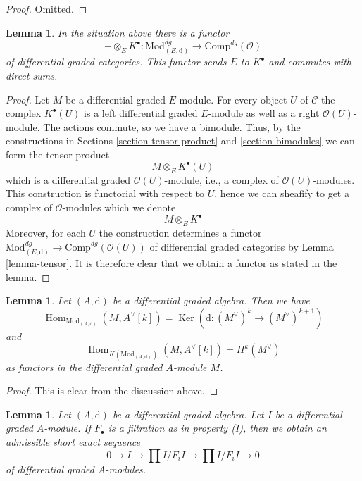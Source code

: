 \documentclass{stacks-project}
\theoremstyle{plain}
\newtheorem{lemma}[subsection]{Lemma}
\theoremstyle{definition}
\theoremstyle{remark}
\numberwithin{equation}{subsection}
\def\Hom{\mathop{\mathrm{Hom}}\nolimits}
\def\Ker{\mathop{\mathrm{Ker}}}
\begin{document}
\begin{proof}
Omitted.
\end{proof}

\begin{lemma}
\label{lemma-tensor-with-complex}
In the situation above there is a functor
$$
- \otimes_E K^\bullet :
\text{Mod}^{dg}_{(E, \text{d})}
\longrightarrow
\text{Comp}^{dg}(\mathcal{O})
$$
of differential graded categories. This functor sends $E$ to $K^\bullet$
and commutes with direct sums.
\end{lemma}

\begin{proof}
Let $M$ be a differential graded $E$-module. For every object $U$ of
$\mathcal{C}$ the complex $K^\bullet(U)$ is a left differential
graded $E$-module as well as a right $\mathcal{O}(U)$-module.
The actions commute, so we have a bimodule.
Thus, by the constructions in
Sections \ref{section-tensor-product} and \ref{section-bimodules}
we can form the tensor product
$$
M \otimes_E K^\bullet(U)
$$
which is a differential graded $\mathcal{O}(U)$-module, i.e., a complex
of $\mathcal{O}(U)$-modules. This construction is functorial with respect
to $U$, hence we can sheafify to get a complex of $\mathcal{O}$-modules
which we denote
$$
M \otimes_E K^\bullet
$$
Moreover, for each $U$ the construction determines a functor
$\text{Mod}^{dg}_{(E, \text{d})} \to \text{Comp}^{dg}(\mathcal{O}(U))$
of differential graded categories by Lemma \ref{lemma-tensor}.
It is therefore clear that we obtain a functor as stated in the lemma.
\end{proof}

\begin{lemma}
\label{lemma-hom-into-shift-dual-free}
Let $(A, \text{d})$ be a differential graded algebra. Then we have
$$
\Hom_{\text{Mod}_{(A, \text{d})}}(M, A^\vee[k]) =
\Ker(\text{d} : (M^\vee)^k \to (M^\vee)^{k + 1})
$$
and
$$
\Hom_{K(\text{Mod}_{(A, \text{d})})}(M, A^\vee[k]) = H^k(M^\vee)
$$
as functors in the differential graded $A$-module $M$.
\end{lemma}

\begin{proof}
This is clear from the discussion above.
\end{proof}

\begin{lemma}
\label{lemma-property-I-sequence}
Let $(A, \text{d})$ be a differential graded algebra.
Let $I$ be a differential graded $A$-module. If $F_\bullet$
is a filtration as in property (I), then we obtain an
admissible short exact sequence
$$
0 \to I \to
\prod\nolimits I/F_iI \to
\prod\nolimits I/F_iI \to 0
$$
of differential graded $A$-modules.
\end{lemma}
\end{document}
